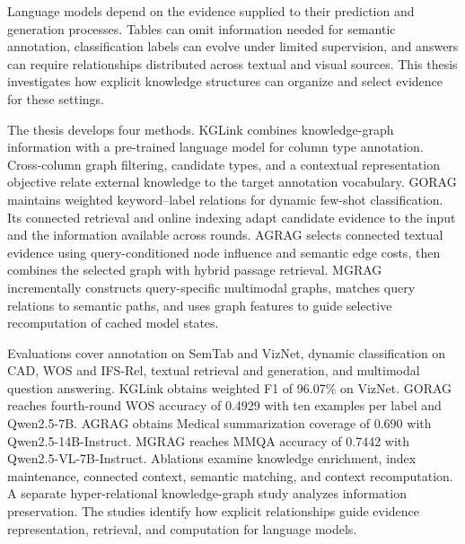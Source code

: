 Language models depend on the evidence supplied to their prediction and generation processes. Tables can omit information needed for semantic annotation, classification labels can evolve under limited supervision, and answers can require relationships distributed across textual and visual sources. This thesis investigates how explicit knowledge structures can organize and select evidence for these settings.

The thesis develops four methods. KGLink combines knowledge-graph information with a pre-trained language model for column type annotation. Cross-column graph filtering, candidate types, and a contextual representation objective relate external knowledge to the target annotation vocabulary. GORAG maintains weighted keyword--label relations for dynamic few-shot classification. Its connected retrieval and online indexing adapt candidate evidence to the input and the information available across rounds. AGRAG selects connected textual evidence using query-conditioned node influence and semantic edge costs, then combines the selected graph with hybrid passage retrieval. MGRAG incrementally constructs query-specific multimodal graphs, matches query relations to semantic paths, and uses graph features to guide selective recomputation of cached model states.

Evaluations cover annotation on SemTab and VizNet, dynamic classification on CAD, WOS and IFS-Rel, textual retrieval and generation, and multimodal question answering. KGLink obtains weighted F1 of 96.07\% on VizNet. GORAG reaches fourth-round WOS accuracy of 0.4929 with ten examples per label and Qwen2.5-7B. AGRAG obtains Medical summarization coverage of 0.690 with Qwen2.5-14B-Instruct. MGRAG reaches MMQA accuracy of 0.7442 with Qwen2.5-VL-7B-Instruct. Ablations examine knowledge enrichment, index maintenance, connected context, semantic matching, and context recomputation. A separate hyper-relational knowledge-graph study analyzes information preservation. The studies identify how explicit relationships guide evidence representation, retrieval, and computation for language models.
